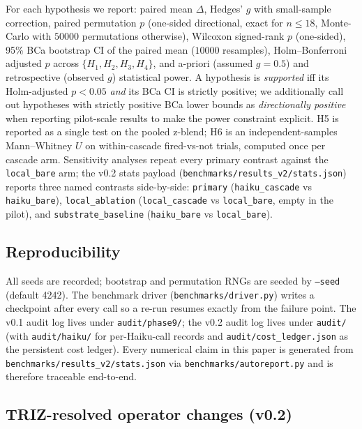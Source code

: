 For each hypothesis we report: paired mean $\Delta$, Hedges' $g$ with small-sample correction, paired permutation $p$ (one-sided directional, exact for $n\le 18$, Monte-Carlo with $50000$ permutations otherwise), Wilcoxon signed-rank $p$ (one-sided), 95\% BCa bootstrap CI of the paired mean ($10000$ resamples), Holm--Bonferroni adjusted $p$ across $\{H_1, H_2, H_3, H_4\}$, and a-priori (assumed $g=0.5$) and retrospective (observed $g$) statistical power. A hypothesis is \emph{supported} iff its Holm-adjusted $p<0.05$ \emph{and} its BCa CI is strictly positive; we additionally call out hypotheses with strictly positive BCa lower bounds as \emph{directionally positive} when reporting pilot-scale results to make the power constraint explicit. H5 is reported as a single test on the pooled z-blend; H6 is an independent-samples Mann--Whitney $U$ on within-cascade fired-vs-not trials, computed once per cascade arm. Sensitivity analyses repeat every primary contrast against the \texttt{local\_bare} arm; the v0.2 stats payload (\texttt{benchmarks/results\_v2/stats.json}) reports three named contrasts side-by-side: \texttt{primary} (\texttt{haiku\_cascade} vs \texttt{haiku\_bare}), \texttt{local\_ablation} (\texttt{local\_cascade} vs \texttt{local\_bare}, empty in the pilot), and \texttt{substrate\_baseline} (\texttt{haiku\_bare} vs \texttt{local\_bare}).

\subsection{Reproducibility}

All seeds are recorded; bootstrap and permutation RNGs are seeded by \texttt{--seed} (default 4242). The benchmark driver (\texttt{benchmarks/driver.py}) writes a checkpoint after every call so a re-run resumes exactly from the failure point. The v0.1 audit log lives under \texttt{audit/phase9/}; the v0.2 audit log lives under \texttt{audit/} (with \texttt{audit/haiku/} for per-Haiku-call records and \texttt{audit/cost\_ledger.json} as the persistent cost ledger). Every numerical claim in this paper is generated from \texttt{benchmarks/results\_v2/stats.json} via \texttt{benchmarks/autoreport.py} and is therefore traceable end-to-end.

\subsection{TRIZ-resolved operator changes (v0.2)}

